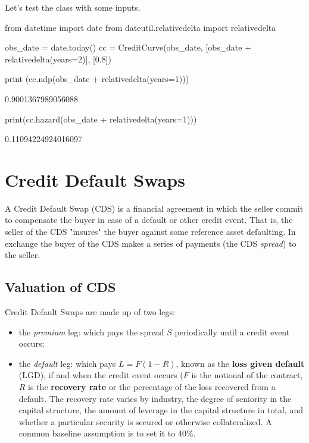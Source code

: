 Let's test the class with some inputs.
\begin{ipython}
from datetime import date
from dateutil.relativedelta import relativedelta
	
obs_date = date.today()
cc = CreditCurve(obs_date, [obs_date + relativedelta(years=2)], [0.8])
	
print (cc.ndp(obs_date + relativedelta(years=1)))
\end{ipython}
\begin{ioutput}
0.9001367989056088
\end{ioutput}
\begin{ipython}
print(cc.hazard(obs_date + relativedelta(years=1)))
\end{ipython}
\begin{ioutput}
0.11094224924016097
\end{ioutput}

\section{Credit Default Swaps}
\label{sec:credit-default-swaps}


A Credit Default Swap (CDS) is a financial agreement in which the seller commit to compensate the buyer in case of a default or other credit event. That is, the seller of the CDS "insures" the buyer against some reference asset defaulting. In exchange the buyer of the CDS makes a series of payments (the CDS \emph{spread}) to the seller.

\subsection{Valuation of CDS}
\label{sec:cds_valuation}

Credit Default Swaps are made up of two legs:

\begin{itemize}
\tightlist
\item the \emph{premium} leg: which pays the spread $S$ periodically until a credit event occurs;
\item the \emph{default} leg: which pays $L = F(1 - R)$, known as the \textbf{loss given default} (LGD), if and when the credit event occurs ($F$ is the notional of the contract, $R$ is the \textbf{recovery rate} or the percentage of the loss recovered from a default. The recovery rate varies by industry, the degree of seniority in the capital structure, the amount of leverage in the capital structure in total, and whether a particular security is secured or otherwise collateralized. A common baseline assumption is to set it to 40\%.
\end{itemize}

